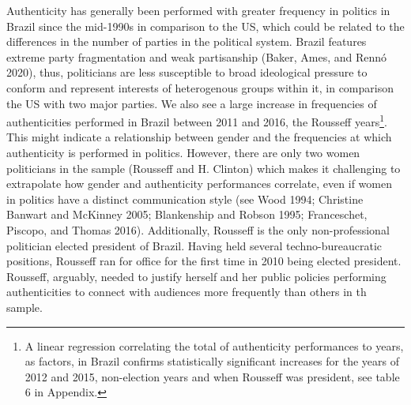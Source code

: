 \documentclass[
  12pt,
]{article}
\begin{document}
Authenticity has generally been performed with greater frequency in
politics in Brazil since the mid-1990s in comparison to the US, which
could be related to the differences in the number of parties in the
political system. Brazil features extreme party fragmentation and weak
partisanship (Baker, Ames, and Rennó 2020), thus, politicians are less
susceptible to broad ideological pressure to conform and represent
interests of heterogenous groups within it, in comparison the US with
two major parties. We also see a large increase in frequencies of
authenticities performed in Brazil between 2011 and 2016, the Rousseff
years\footnote{ A linear regression correlating the total of
  authenticity performances to years, as factors, in Brazil confirms
  statistically significant increases for the years of 2012 and 2015,
  non-election years and when Rousseff was president, see table 6 in
  Appendix.}. This might indicate a relationship between gender and the
frequencies at which authenticity is performed in politics. However,
there are only two women politicians in the sample (Rousseff and H.
Clinton) which makes it challenging to extrapolate how gender and
authenticity performances correlate, even if women in politics have a
distinct communication style (see Wood 1994; Christine Banwart and
McKinney 2005; Blankenship and Robson 1995; Franceschet, Piscopo, and
Thomas 2016). Additionally, Rousseff is the only non-professional
politician elected president of Brazil. Having held several
techno-bureaucratic positions, Rousseff ran for office for the first
time in 2010 being elected president. Rousseff, arguably, needed to
justify herself and her public policies performing authenticities to
connect with audiences more frequently than others in th sample.
\end{document}
